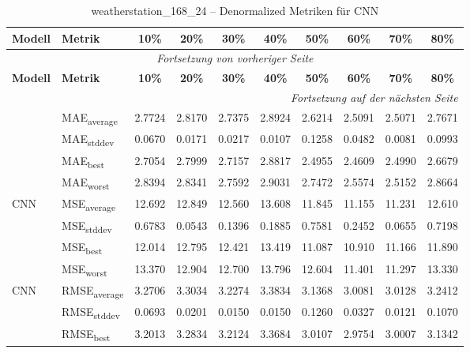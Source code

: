{\small
\begin{longtable}{l l c c c c c c c c}
    \toprule
    \textbf{Modell} & \textbf{Metrik} & \textbf{10\%} & \textbf{20\%} & \textbf{30\%} & \textbf{40\%} & \textbf{50\%} & \textbf{60\%} & \textbf{70\%} & \textbf{80\%} \\
    \midrule
    \endfirsthead
    \multicolumn{10}{c}{\textit{Fortsetzung von vorheriger Seite}} \\
    \toprule
    \textbf{Modell} & \textbf{Metrik} & \textbf{10\%} & \textbf{20\%} & \textbf{30\%} & \textbf{40\%} & \textbf{50\%} & \textbf{60\%} & \textbf{70\%} & \textbf{80\%} \\
    \midrule
    \endhead
    \midrule
    \multicolumn{10}{r}{\textit{Fortsetzung auf der nächsten Seite}} \\
    \midrule
    \endfoot
    \bottomrule
    \caption{weatherstation_168_24 -- Denormalized Metriken für CNN}
    \label{tab:weatherstation_168_24_denormalized_cnn}
    \endlastfoot
\multirow{4}{*}{CNN} & MAE\textsubscript{average} & 2.7724 & 2.8170 & 2.7375 & 2.8924 & 2.6214 & 2.5091 & 2.5071 & 2.7671 \\
 & MAE\textsubscript{stddev} & 0.0670 & 0.0171 & 0.0217 & 0.0107 & 0.1258 & 0.0482 & 0.0081 & 0.0993 \\
 & MAE\textsubscript{best} & 2.7054 & 2.7999 & 2.7157 & 2.8817 & 2.4955 & 2.4609 & 2.4990 & 2.6679 \\
 & MAE\textsubscript{worst} & 2.8394 & 2.8341 & 2.7592 & 2.9031 & 2.7472 & 2.5574 & 2.5152 & 2.8664 \\
\cmidrule(lr){2-10}
\multirow{4}{*}{CNN} & MSE\textsubscript{average} & 12.692 & 12.849 & 12.560 & 13.608 & 11.845 & 11.155 & 11.231 & 12.610 \\
 & MSE\textsubscript{stddev} & 0.6783 & 0.0543 & 0.1396 & 0.1885 & 0.7581 & 0.2452 & 0.0655 & 0.7198 \\
 & MSE\textsubscript{best} & 12.014 & 12.795 & 12.421 & 13.419 & 11.087 & 10.910 & 11.166 & 11.890 \\
 & MSE\textsubscript{worst} & 13.370 & 12.904 & 12.700 & 13.796 & 12.604 & 11.401 & 11.297 & 13.330 \\
\cmidrule(lr){2-10}
\multirow{4}{*}{CNN} & RMSE\textsubscript{average} & 3.2706 & 3.3034 & 3.2274 & 3.3834 & 3.1368 & 3.0081 & 3.0128 & 3.2412 \\
 & RMSE\textsubscript{stddev} & 0.0693 & 0.0201 & 0.0150 & 0.0150 & 0.1260 & 0.0327 & 0.0121 & 0.1070 \\
 & RMSE\textsubscript{best} & 3.2013 & 3.2834 & 3.2124 & 3.3684 & 3.0107 & 2.9754 & 3.0007 & 3.1342 \\

\end{longtable}}
